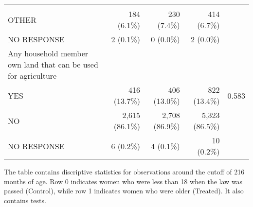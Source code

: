 \documentclass{article}
\begin{document}
\begin{table}[!h]
\begin{tabular}{lllll}
  \multicolumn{1}{r}{} \\
\multicolumn{1}{l}{\hspace{1em}OTHER} &
  \multicolumn{1}{r}{184 (6.1\%)} &
  \multicolumn{1}{r}{230 (7.4\%)} &
  \multicolumn{1}{r}{414 (6.7\%)} &
  \multicolumn{1}{r}{} \\
\multicolumn{1}{l}{\hspace{1em}NO RESPONSE} &
  \multicolumn{1}{r}{2 (0.1\%)} &
  \multicolumn{1}{r}{0 (0.0\%)} &
  \multicolumn{1}{r}{2 (0.0\%)} &
  \multicolumn{1}{r}{} \\
\multicolumn{1}{l}{Any household member own land that can be used for agriculture} &
  \multicolumn{1}{r}{} &
  \multicolumn{1}{r}{} &
  \multicolumn{1}{r}{} &
  \multicolumn{1}{r}{} \\
\multicolumn{1}{l}{\hspace{1em}YES} &
  \multicolumn{1}{r}{416 (13.7\%)} &
  \multicolumn{1}{r}{406 (13.0\%)} &
  \multicolumn{1}{r}{822 (13.4\%)} &
  \multicolumn{1}{r}{0.583} \\
\multicolumn{1}{l}{\hspace{1em}NO} &
  \multicolumn{1}{r}{2,615 (86.1\%)} &
  \multicolumn{1}{r}{2,708 (86.9\%)} &
  \multicolumn{1}{r}{5,323 (86.5\%)} &
  \multicolumn{1}{r}{} \\
\multicolumn{1}{l}{\hspace{1em}NO RESPONSE} &
  \multicolumn{1}{r}{6 (0.2\%)} &
  \multicolumn{1}{r}{4 (0.1\%)} &
  \multicolumn{1}{r}{10 (0.2\%)} &
  \multicolumn{1}{r}{} \\
\cline{1-5}
\end{tabular}

\footnotesize{
The table contains discriptive statistics for observations around the cutoff of 216 months of age. Row 0 indicates women who were less than 18 when the law was passed (Control), while row 1 indicates women who were older (Treated). It also contains tests.
}
\end{table}
\end{document}
